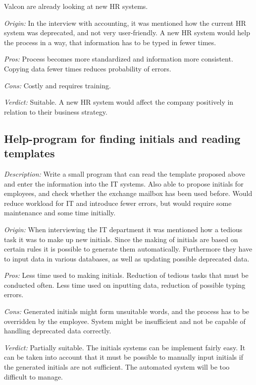 Valcon are already looking at new HR systems.

\emph{Origin:}
In the interview with accounting, it was mentioned how the current HR system was deprecated, and not very user-friendly.
A new HR system would help the process in a way, that information has to be typed in fewer times.

\noindent \emph{Pros:} Process becomes more standardized and information more consistent. Copying data fewer times reduces probability of errors.

\noindent \emph{Cons:} Costly and requires training.

\emph{Verdict:}
Suitable. A new HR system would affect the company positively in relation to their business strategy.

\subsection{Help-program for finding initials and reading templates}
\emph{Description:} 
Write a small program that can read the template proposed above and enter the information into the IT systems.
Also able to propose initials for employees, and check whether the exchange mailbox has been used before.
Would reduce workload for IT and introduce fewer errors, but would require some maintenance and some time initially.

\emph{Origin:}
When interviewing the IT department it was mentioned how a tedious task it was to make up new initials. Since the making of initials are based on certain rules it is possible to generate them automatically. Furthermore they have to input data in various databases, as well as updating possible deprecated data.

\noindent \emph{Pros:} 
Less time used to making initials. Reduction of tedious tasks that must be conducted often.
Less time used on inputting data, reduction of possible typing errors.

\noindent \emph{Cons:} 
Generated initials might form unsuitable words, and the process has to be overridden by the employee.
System might be insufficient and not be capable of handling deprecated data correctly. 

\emph{Verdict:}
Partially suitable. The initials systems can be implement fairly easy. It can be taken into account that it must be possible to manually input initials if the generated initials are not sufficient.
The automated system will be too difficult to manage.

